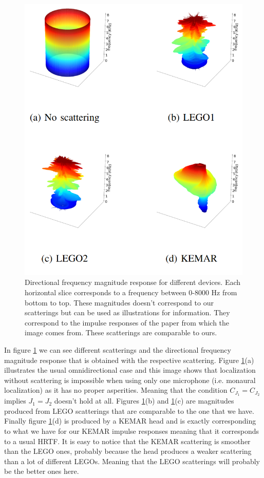 \begin{figure}[h]
\centering
\includegraphics[scale = 0.35]{cones.png}
\caption{Directional frequency magnitude response for different devices. Each horizontal slice  corresponds to a frequency between 0-8000 Hz from bottom to top. These magnitudes doesn't correspond to our scatterings but can be used as illustrations for information. They correspond to the impulse responses of the paper \cite{dalia} from which the image comes from. These scatterings are comparable to ours.}
\label{fig:cones}
\end{figure}

In figure \ref{fig:cones} we can see different scatterings and the directional frequency magnitude response that is obtained with the respective scattering. Figure \ref{fig:cones}(a) illustrates the usual omnidirectional case and this image shows that localization without scattering is impossible when using only one microphone (i.e. monaural localization) as it has no proper asperities. Meaning that the condition $C_{J_1} = C_{J_2}$ implies  $J_1 = J_2$ doesn't hold at all. Figures \ref{fig:cones}(b) and \ref{fig:cones}(c) are magnitudes produced from LEGO scatterings that are comparable to the one that we have. Finally figure \ref{fig:cones}(d) is produced by a KEMAR head and is exactly corresponding to what we have for our KEMAR impulse responses meaning that it corresponds to a usual HRTF. It is easy to notice that the KEMAR scattering is smoother than the LEGO ones, probably because the head produces a weaker scattering than a lot of different LEGOs. Meaning that the LEGO scatterings will probably be the better ones here.

